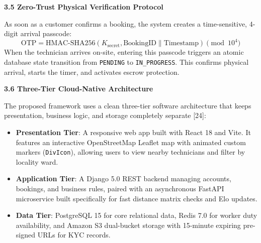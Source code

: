 \documentclass[10pt,twocolumn,a4paper]{article}
\begin{document}
\vspace{0.35em}
\noindent
\textbf{3.5 Zero-Trust Physical Verification Protocol}

As soon as a customer confirms a booking, the system creates a time-sensitive, 4-digit arrival passcode:
\begin{equation}
\text{OTP} = \text{HMAC-SHA256}(K_{\text{secret}}, \text{BookingID} \parallel \text{Timestamp}) \pmod{10^4}
\end{equation}
When the technician arrives on-site, entering this passcode triggers an atomic database state transition from \texttt{PENDING} to \texttt{IN\_PROGRESS}. This confirms physical arrival, starts the timer, and activates escrow protection.

\vspace{0.35em}
\noindent
\textbf{3.6 Three-Tier Cloud-Native Architecture}

The proposed framework uses a clean three-tier software architecture that keeps presentation, business logic, and storage completely separate [24]:
\begin{itemize}
    \item \textbf{Presentation Tier}: A responsive web app built with React 18 and Vite. It features an interactive OpenStreetMap Leaflet map with animated custom markers (\texttt{DivIcon}), allowing users to view nearby technicians and filter by locality ward.
    \item \textbf{Application Tier}: A Django 5.0 REST backend managing accounts, bookings, and business rules, paired with an asynchronous FastAPI microservice built specifically for fast distance matrix checks and Elo updates.
    \item \textbf{Data Tier}: PostgreSQL 15 for core relational data, Redis 7.0 for worker duty availability, and Amazon S3 dual-bucket storage with 15-minute expiring pre-signed URLs for KYC records.
\end{itemize}
\end{document}
